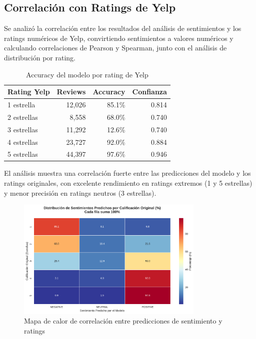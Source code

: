 \documentclass[12pt,a4paper,twoside,openany]{book}
\begin{document}
\subsection{Correlación con Ratings de Yelp}

Se analizó la correlación entre los resultados del análisis de sentimientos y los ratings numéricos de Yelp, convirtiendo sentimientos a valores numéricos y calculando correlaciones de Pearson y Spearman, junto con el análisis de distribución por rating.

\begin{table}[H]
\centering
\caption{Accuracy del modelo por rating de Yelp}
\begin{tabular}{@{}lrrr@{}}
\toprule
\textbf{Rating Yelp} & \textbf{Reviews} & \textbf{Accuracy} & \textbf{Confianza} \\
\midrule
1 estrella & 12,026 & 85.1\% & 0.814 \\
2 estrellas & 8,558 & 68.0\% & 0.740 \\
3 estrellas & 11,292 & 12.6\% & 0.740 \\
4 estrellas & 23,727 & 92.0\% & 0.884 \\
5 estrellas & 44,397 & 97.6\% & 0.946 \\
\bottomrule
\end{tabular}
\end{table}

El análisis muestra una correlación fuerte entre las predicciones del modelo y los ratings originales, con excelente rendimiento en ratings extremos (1 y 5 estrellas) y menor precisión en ratings neutros (3 estrellas).

\begin{figure}[H]
\centering
\includegraphics[width=0.8\textwidth]{figures/sentiment_prediction_correlation_heatmap.png}
\caption{Mapa de calor de correlación entre predicciones de sentimiento y ratings}
\label{fig:sentiment_correlation_heatmap}
\end{figure}
\end{document}
